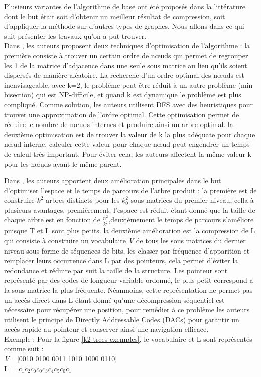 Plusieurs variantes de l'algorithme de base ont été proposés dans la littérature dont le but était soit d'obtenir un meilleur résultat de compression, soit d'appliquer la méthode sur d'autres types de graphes. Nous allons dans ce qui suit présenter les travaux qu'on a put trouver.\\

Dans \citep{shi2012optimizing}, les auteurs proposent deux techniques d'optimisation de l'algorithme : la première consiste à trouver un certain ordre de nœuds qui permet de regrouper les 1 de la matrice d'adjacence dans une seule sous matrice au lieu qu'ils soient dispersés de manière aléatoire. La recherche d'un ordre optimal des nœuds est inenvisageable, avec k=2, le problème peut être réduit à un autre problème (min bisection) qui est NP-difficile, et quand k est dynamique le problème est plus compliqué. Comme solution, les auteurs utilisent DFS avec des heuristiques pour trouver une approximation de l'ordre optimal. Cette optimisation permet de réduire le nombre de nœuds internes et produire ainsi un arbre optimal. la deuxième optimisation est de trouver la valeur de k la plus adéquate pour chaque nœud interne, calculer cette valeur pour chaque nœud peut engendrer un temps de calcul très important. Pour éviter cela, les auteurs affectent la même valeur k pour les nœuds ayant le même parent. 	

Dans \citep{brisaboa2014compact}, les auteurs apportent deux amélioration principales dans le but d'optimiser l'espace et le temps de parcours de l'arbre produit : la première est de construire $k^2$ arbres distincts pour les $k_{0}^{2}$ sous matrices du premier niveau, cella à plusieurs avantages, premièrement, l'espace est réduit étant donné que la taille de chaque arbre est en fonction de $\frac{n^2}{k^2}$,deuxièmement le temps de parcours s'améliore puisque T et L sont plus petits. la deuxième amélioration est la compression de L qui consiste à construire un vocabulaire \textit{V} de tous les sous matrices du dernier niveau sous forme de séquences de bits, les classer par fréquence d'apparition et remplacer leurs occurrence dans L par des pointeurs, cela permet d'éviter la redondance et réduire par suit la taille de la structure. Les pointeur sont représenté par des codes de longueur variable ordonné, le plus petit correspond a la sous matrice la plus fréquente. Néanmoins, cette représentation ne permet  pas un accès direct dans L étant donné qu'une décompression séquentiel est nécessaire pour récupérer une position, pour remédier à ce problème les auteurs utilisent le principe de Directly Addressable Codes (DACs) \citep{brisaboa2013dacs} pour garantir un accès rapide au pointeur et conserver ainsi une navigation efficace.\\
Exemple : Pour la figure \ref{k2-trees-exemples}, le vocabulaire et L sont représentés comme suit :\\
\textit{V}= [0010 0100 0011 1010 1000 0110]\\
L = $c_{1}c_{2}c_{0}c_{0}c_{3}c_{4}c_{5}c_{0}c_{1}$ \\

